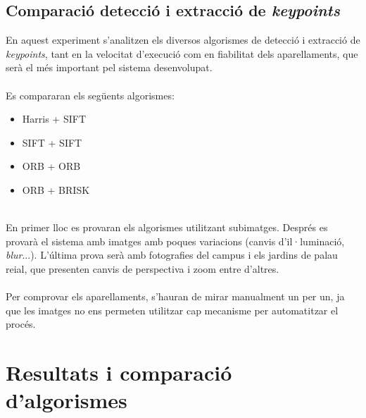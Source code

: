 	\subsection{Comparació detecció i extracció de \textit{keypoints}}
		En aquest experiment s'analitzen els diversos algorismes de detecció i extracció de \textit{keypoints}, tant en la velocitat d'execució com en fiabilitat dels aparellaments, que serà el més important
		pel sistema desenvolupat.\\\\
		Es compararan els següents algorismes:
		\begin{multicols}{2} 
			\begin{itemize}
				\item{Harris + SIFT}
				\item{SIFT + SIFT}
				\item{ORB + ORB}
				\item{ORB + BRISK}
			\end{itemize}
		\end{multicols}
		\noindent
		\\{}
		En primer lloc es provaran els algorismes utilitzant subimatges. Després es provarà el sistema amb imatges amb poques variacions (canvis d'il·luminació, \textit{blur}...). L'última prova serà amb fotografies
		del campus i els jardins de palau reial, que presenten canvis de perspectiva i zoom entre d'altres.\\\\
		Per comprovar els aparellaments, s'hauran de mirar manualment un per un, ja que les imatges no ens permeten utilitzar cap mecanisme per automatitzar el procés.
\newpage
\section{Resultats i comparació d'algorismes}

